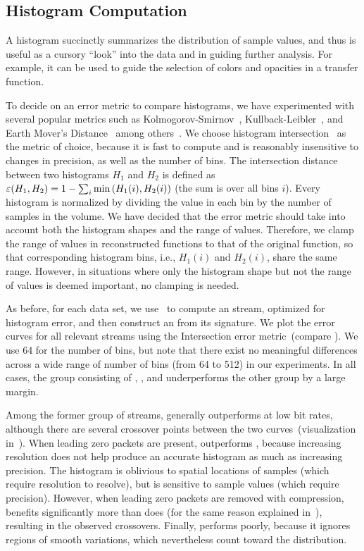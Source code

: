 \subsection{Histogram Computation}\label{sec:histogram}

A histogram succinctly summarizes the distribution of sample values, and thus is useful as a cursory
``look'' into the data and in guiding further analysis. For example, it can be used to guide the
selection of colors and opacities in a transfer function.

To decide on an error metric to compare histograms, we have experimented with several popular
metrics such as Kolmogorov-Smirnov~\cite{smirnov1948}, Kullback-Leibler~\cite{kullback1951}, and
Earth Mover's Distance~\cite{emd1998} among others~\cite{Hellinger1909,Bhattacharyya1943}. We choose
histogram intersection~\cite{histogram_intersection1991} as the metric of choice, because it is fast
to compute and is reasonably insensitive to changes in precision, as well as the number of bins. The
intersection distance between two histograms $H_1$ and $H_2$ is defined as
$\err(H_1,H_2)=1-\sum_{i}{\min{(H_1(i),H_2(i))}}$ (the sum is over all bins $i$). Every histogram is
normalized by dividing the value in each bin by the number of samples in the volume. We have decided
that the error metric should take into account both the histogram shapes and the range of values.
Therefore, we clamp the range of values in reconstructed functions to that of the original function,
so that corresponding histogram bins, i.e., $H_1(i)$ and $H_2(i)$, share the same range. However, in
situations where only the histogram shape but not the range of values is deemed important, no
clamping is needed.

As before, for each data set, we use~ to compute an \shop stream, optimized for
histogram error, and then construct an \shsg from its signature. We plot the error curves for all
relevant streams using the Intersection error metric~(compare
). We use 64 for the number of bins, but note that there exist
no meaningful differences across a wide range of number of bins (from 64 to 512) in our experiments.
In all cases, the group consisting of \sbit, \slvl, and \smag underperforms the other group by a
large margin.

Among the former group of streams, \slvl generally outperforms \sbit at low bit rates, although
there are several crossover points between the two curves~(visualization
in~). When leading zero packets are present, \slvl outperforms \sbit,
because increasing resolution does not help produce an accurate histogram as much as increasing
precision. The histogram is oblivious to spatial locations of samples (which require resolution to
resolve), but is sensitive to sample values (which require precision). However, when leading zero
packets are removed with compression, \sbit benefits significantly more than \slvl does (for the
same reason explained in~), resulting in the observed crossovers. Finally,
\smag performs poorly, because it ignores regions of smooth variations, which nevertheless count
toward the distribution.

